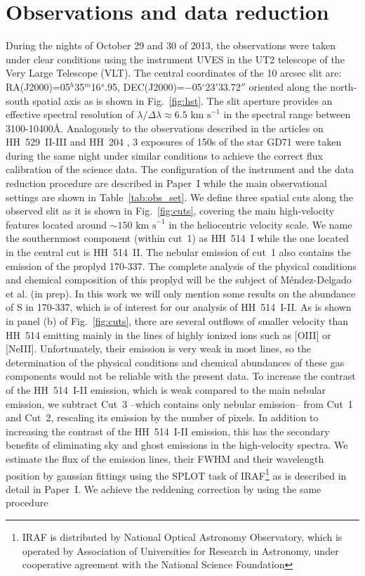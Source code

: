 \documentclass[fleqn,usenatbib]{mnras}
\begin{document}
\section{Observations and data reduction}
\label{sec:data}

During the nights of October 29 and 30 of 2013, the observations were taken under clear conditions using the instrument UVES in the UT2 telescope of the Very Large Telescope (VLT). The central coordinates of the 10 arcsec slit are: RA(J2000)=05$^h$35$^m$16$^s$.95, DEC(J2000)=$-$05$^{\circ}$23$'$33.72$''$ oriented along the north-south spatial axis as is shown in Fig.~\ref{fig:hst}. The slit aperture provides an effective spectral resolution of $\lambda/\Delta \lambda \approx 6.5 \text{ km s}^{-1}$ in the spectral range between 3100-10400\AA. Analogously to the observations described in the articles on HH~529~II-III and HH~204 \citep[][hereinafter Paper~I and Paper~II, respectively]{mendez2021,mendez2021-2}, 3 exposures of 150s of the star GD71 \citep{Moehler14a, Moehler14b} were taken during the same night under similar conditions to achieve the correct flux calibration of the science data. The configuration of the instrument and the data reduction procedure are described in Paper~I while the main observational settings are shown in Table~\ref{tab:obs_set}. We define three spatial cuts along the observed slit as it is shown in Fig.~\ref{fig:cuts}, covering the main high-velocity features located around $\sim 150\text{ km s}^{-1}$ in the heliocentric velocity scale. We name the southernmost component (within cut~1) as HH~514~I while the one located in the central cut is HH~514~II. The nebular emission of cut~1 also contains the emission of the proplyd 170-337. The complete analysis of the physical conditions and chemical composition of this proplyd will be the subject of M\'endez-Delgado et al. (in prep). In this work we will only mention some results on the abundance of S in 170-337, which is of interest for our analysis of HH~514~I-II. As is shown in panel (b) of Fig.~\ref{fig:cuts}, there are several outflows of smaller velocity than HH~514 emitting mainly in the lines of highly ionized ions such as [O\thinspace III] or [Ne\thinspace III]. Unfortunately, their emission is very weak in most lines, so the determination of the physical conditions and chemical abundances of these gas components would not be reliable with the present data. To increase the contrast of the HH~514~I-II emission, which is weak compared to the main nebular emission, we subtract Cut~3 --which contains only nebular emission-- from Cut~1 and Cut~2, rescaling its emission by the number of pixels. In addition to increasing the contrast of the HH~514~I-II emission, this has the secondary benefits of eliminating sky and ghost emissions in the high-velocity spectra. We estimate the flux of the emission lines, their FWHM and their wavelength position by gaussian fittings using the SPLOT task of IRAF\footnote{IRAF is distributed by National Optical Astronomy Observatory, which is operated by Association of Universities for Research in Astronomy, under cooperative agreement with the National Science Foundation} \citep{Tody93} as is described in detail in Paper~I. We achieve the reddening correction by using the same procedure 
\end{document}
